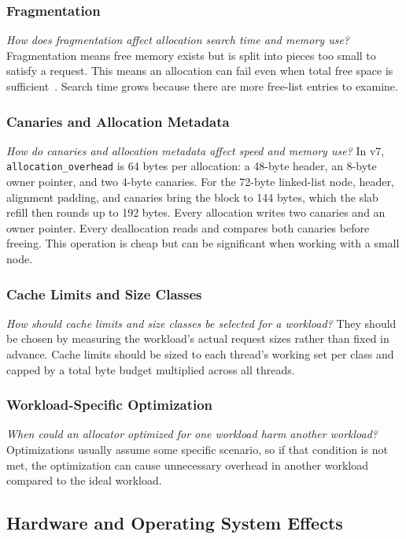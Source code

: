 \subsubsection{Fragmentation}
\emph{How does fragmentation affect allocation search time and memory use?}
Fragmentation means free memory exists but is split into pieces too small to
satisfy a request.
This means an allocation can fail even when total free space is
sufficient~\cite{wilson1995}.
Search time grows because there are more free-list entries to examine.

\subsubsection{Canaries and Allocation Metadata}
\emph{How do canaries and allocation metadata affect speed and memory use?}
In v7, \texttt{allocation\_overhead} is 64 bytes per allocation: a 48-byte
header, an 8-byte owner pointer, and two 4-byte canaries.
For the 72-byte linked-list node, header, alignment padding, and canaries bring
the block to 144 bytes, which the slab refill then rounds up to 192 bytes.
Every allocation writes two canaries and an owner pointer.
Every deallocation reads and compares both canaries before freeing.
This operation is cheap but can be significant when working with a small node.

\subsubsection{Cache Limits and Size Classes}
\emph{How should cache limits and size classes be selected for a workload?}
They should be chosen by measuring the workload's actual request sizes rather
than fixed in advance.
Cache limits should be sized to each thread's working set per class and capped
by a total byte budget multiplied across all threads.

\subsubsection{Workload-Specific Optimization}
\emph{When could an allocator optimized for one workload harm another
workload?}
Optimizations usually assume some specific scenario, so if that condition is
not met, the optimization can cause unnecessary overhead in another workload
compared to the ideal workload.

\subsection{Hardware and Operating System Effects}
\label{sec:rq-hardware}

